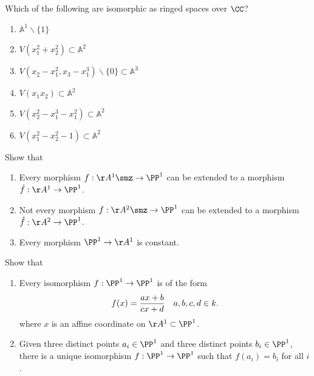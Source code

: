 \begin{problem}[Gathmann 4.19]

Which of the following are isomorphic as ringed spaces over \(\CC\)?

\begin{enumerate}
\def\labelenumi{(\alph{enumi})}
\item
  \(\mathbb{A}^{1} \backslash\{1\}\)
\item
  \(V\left(x_{1}^{2}+x_{2}^{2}\right) \subset \mathbb{A}^{2}\)
\item
  \(V\left(x_{2}-x_{1}^{2}, x_{3}-x_{1}^{3}\right) \backslash\{0\} \subset \mathbb{A}^{3}\)
\item
  \(V\left(x_{1} x_{2}\right) \subset \mathbb{A}^{2}\)
\item
  \(V\left(x_{2}^{2}-x_{1}^{3}-x_{1}^{2}\right) \subset \mathbb{A}^{2}\)
\item
  \(V\left(x_{1}^{2}-x_{2}^{2}-1\right) \subset \mathbb{A}^{2}\)
\end{enumerate}

\end{problem}

\begin{problem}[Gathmann 5.7]

Show that

\begin{enumerate}
\def\labelenumi{\alph{enumi}.}
\item
  Every morphism \(f:\AA^1\smz \to \PP^1\) can be extended to a morphism
  \(\hat f: \AA^1 \to \PP^1\).
\item
  Not every morphism \(f:\AA^2\smz \to \PP^1\) can be extended to a
  morphism \(\hat f: \AA^2 \to \PP^1\).
\item
  Every morphism \(\PP^1\to \AA^1\) is constant.
\end{enumerate}

\end{problem}

\begin{problem}[Gathmann 5.8]

Show that

\begin{enumerate}
\def\labelenumi{\alph{enumi}.}
\item
  Every isomorphism \(f:\PP^1\to \PP^1\) is of the form
  \begin{align*}  
  f(x) = {ax+b \over cx+d} && a,b,c,d\in k
  .\end{align*} where \(x\) is an affine coordinate on
  \(\AA^1\subset \PP^1\).
\item
  Given three distinct points \(a_i \in \PP^1\) and three distinct
  points \(b_i \in \PP^1\), there is a unique isomorphism
  \(f:\PP^1 \to \PP^1\) such that \(f(a_i) = b_i\) for all \(i\).
\end{enumerate}

\end{problem}


